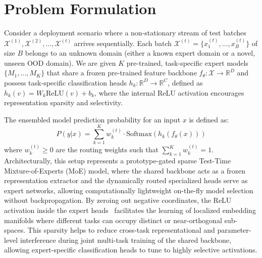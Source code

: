 \documentclass{article}
\theoremstyle{plain}
\theoremstyle{definition}
\theoremstyle{remark}
\begin{document}
\section{Problem Formulation}
\label{sec:problem}
Consider a deployment scenario where a non-stationary stream of test batches $\mathcal{X}^{(1)}, \mathcal{X}^{(2)}, \dots, \mathcal{X}^{(t)}$ arrives sequentially. Each batch $\mathcal{X}^{(t)} = \{x_1^{(t)}, \dots, x_B^{(t)}\}$ of size $B$ belongs to an unknown domain (either a known expert domain or a novel, unseen OOD domain). We are given $K$ pre-trained, task-specific expert models $\{M_1, \dots, M_K\}$ that share a frozen pre-trained feature backbone $f_\theta: \mathcal{X} \to \mathbb{R}^D$ and possess task-specific classification heads $h_k: \mathbb{R}^D \to \mathbb{R}^C$, defined as $h_k(v) = W_k \text{ReLU}(v) + b_k$, where the internal ReLU activation encourages representation sparsity and selectivity.

The ensembled model prediction probability for an input $x$ is defined as:
\begin{equation}
    P(y|x) = \sum_{k=1}^K w_k^{(t)} \cdot \text{Softmax}(h_k(f_\theta(x)))
\end{equation}
where $w_k^{(t)} \ge 0$ are the routing weights such that $\sum_{k=1}^K w_k^{(t)} = 1$. Architecturally, this setup represents a prototype-gated sparse Test-Time Mixture-of-Experts (MoE) model, where the shared backbone acts as a frozen representation extractor and the dynamically routed specialized heads serve as expert networks, allowing computationally lightweight on-the-fly model selection without backpropagation. By zeroing out negative coordinates, the ReLU activation inside the expert heads~\cite{glorot2011deep, jarrett2009what} facilitates the learning of localized embedding manifolds where different tasks can occupy distinct or near-orthogonal sub-spaces. This sparsity helps to reduce cross-task representational and parameter-level interference during joint multi-task training of the shared backbone, allowing expert-specific classification heads to tune to highly selective activations.
\end{document}
